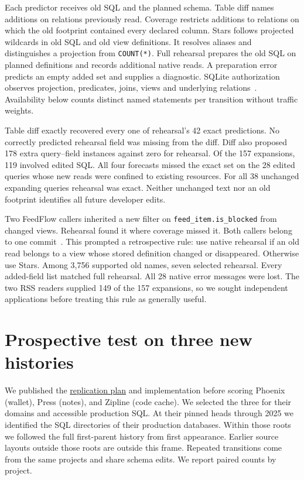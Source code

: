 \documentclass[11pt,a4paper]{article}
\newcommand{\code}[1]{\texttt{#1}}
\begin{document}
Each predictor receives old SQL and the planned schema. Table diff names additions on relations previously read. Coverage restricts additions to relations on which the old footprint contained every declared column. Stars follows projected wildcards in old SQL and old view definitions. It resolves aliases and distinguishes a projection from \code{COUNT(*)}. Full rehearsal prepares the old SQL on planned definitions and records additional native reads. A preparation error predicts an empty added set and supplies a diagnostic. SQLite authorization observes projection, predicates, joins, views and underlying relations~\cite{sqlite}. Availability below counts distinct named statements per transition without traffic weights.

Table diff exactly recovered every one of rehearsal's 42 exact predictions. No correctly predicted rehearsal field was missing from the diff. Diff also proposed 178 extra query--field instances against zero for rehearsal. Of the 157 expansions, 119 involved edited SQL. All four forecasts missed the exact set on the 28 edited queries whose new reads were confined to existing resources. For all 38 unchanged expanding queries rehearsal was exact. Neither unchanged text nor an old footprint identifies all future developer edits.

Two FeedFlow callers inherited a new filter on \code{feed\_item.is\_blocked} from changed views. Rehearsal found it where coverage missed it. Both callers belong to one commit~\cite{feedview}. This prompted a retrospective rule: use native rehearsal if an old read belongs to a view whose stored definition changed or disappeared. Otherwise use Stars. Among 3,756 supported old names, seven selected rehearsal. Every added-field list matched full rehearsal. All 28 native error messages were lost. The two RSS readers supplied 149 of the 157 expansions, so we sought independent applications before treating this rule as generally useful.

\newpage
\section{Prospective test on three new histories}
We published the \href{https://github.com/oraoraoraaa/least-privilege-lab/blob/8ac30a2/research/triage/PLAN.md}{replication plan} and implementation before scoring Phoenix (wallet), Press (notes), and Zipline (code cache). We selected the three for their domains and accessible production SQL. At their pinned heads through 2025 we identified the SQL directories of their production databases. Within those roots we followed the full first-parent history from first appearance. Earlier source layouts outside those roots are outside this frame. Repeated transitions come from the same projects and share schema edits. We report paired counts by project.
\end{document}

